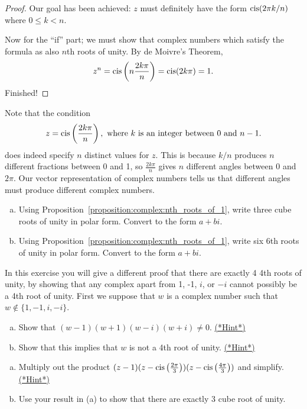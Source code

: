\begin{proof}
Our goal has been achieved: $z$ must definitely have the form $\operatorname{cis}(2\pi k/n)$ where $0 \le k < n$.

Now for the ``if'' part; we must show that complex numbers which satisfy the formula as also $n$th roots of unity.  By de Moivre's Theorem, 
\[ z^{n}=\operatorname{cis}\left(n\frac{2k\pi}{n}\right)=\operatorname{cis}(2k\pi)=1.\]
Finished!

\end{proof}

\begin{rem}
Note that the condition
\[
z=\operatorname{cis}\left(\frac{2k\pi}{n}\right), \text{ where } k \text{ is an integer between }0 \text{ and } n-1.\] 
does indeed specify $n$ distinct values for $z$.  This is because $k/n$ produces $n$ different fractions between 0 and 1, so $\frac{2k\pi}{n}$ gives $n$ different angles between 0 and $2\pi$. Our vector representation of complex numbers tells us that different angles must produce different complex numbers.
\end{rem}

\begin{exercise}{49}
\begin{enumerate}[(a)]
\item
Using Proposition~\ref{proposition:complex:nth_roots_of_1}, write three cube roots of unity in polar form. Convert to the form $a + bi$.
\item
Using Proposition~\ref{proposition:complex:nth_roots_of_1}, write six 6th roots of unity in polar form. Convert to the form $a+bi$.
\end{enumerate}
\end{exercise}

\begin{exercise}{50}
In this exercise you will give a different proof that there are exactly 4 4th roots of unity, by showing that any complex apart from 1, -1, $i$, or $-i$  cannot possibly be a 4th root of unity. First we suppose that $w$ is a complex number such that $w \notin \{1,-1,i,-i \}$. 
\begin{enumerate}[(a)]
\item
Show that $(w-1)(w+1)(w-i)(w+i) \neq 0$.
\hyperref[sec:complex:hints]{(*Hint*)}
\item
Show that this implies that $w$ is not a 4th root of unity.
\hyperref[sec:complex:hints]{(*Hint*)}
\end{enumerate}
\end{exercise}

\begin{exercise}{51}
\begin{enumerate}[(a)]
\item
Multiply out the product $(z - 1)(z - \operatorname{cis}\left(\frac{2\pi}{3}\right))(z - \operatorname{cis}\left(\frac{4\pi}{3}\right))$ and simplify.
\hyperref[sec:complex:hints]{(*Hint*)}
\item
Use your result in (a) to show that there are exactly 3 cube root of unity. 
\end{enumerate}
\end{exercise}

